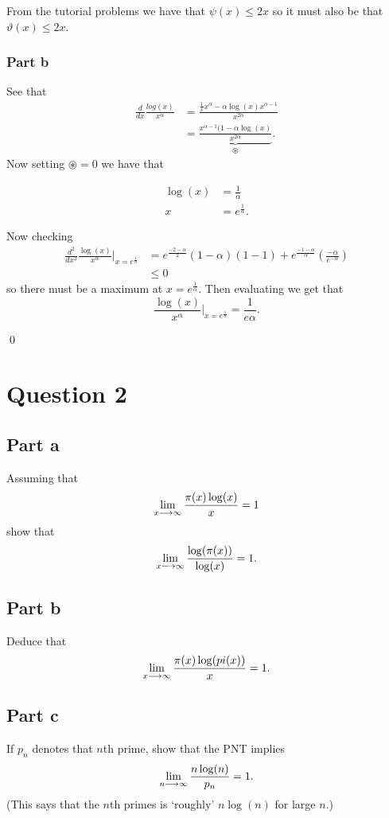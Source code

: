 \documentclass{unswmaths}
\begin{document}
From the tutorial problems we have that $ \psi(x) \leq 2x $ so it must also be that $ \vartheta(x) \leq 2x $.


\subsubsection*{Part b}

See that 
\begin{align*}
	\frac{d}{dx} \frac{log(x)}{x^\alpha} &= \frac{\frac{1}{x} x^\alpha - \alpha \log(x) x^{\alpha-1}}{x^{2\alpha}} \\
		&= \underbrace{\frac{x^{\alpha-1}( 1 - \alpha \log(x)}{x^{2 \alpha}}}_{\circledast}.
\end{align*}
Now setting $ \circledast = 0 $
we have that 

\begin{align*}
	\log(x) &= \frac{1}{\alpha} \\
	x &= e^{\frac{1}{\alpha}}.
\end{align*}


Now checking
\begin{align*}
	\frac{d^2}{dx^2} \frac{\log(x)}{x^\alpha} \Big|_{x = e^{\frac{1}{\alpha}}} &= e^{\frac{-2-\alpha}{2}}(1-\alpha)(1 - 1) + e^\frac{-1-\alpha}{\alpha}\left( \frac{-\alpha}{e^{-\alpha}} \right) \\
	&\leq 0 
\end{align*}
so there must be a maximum at $ x = e^\frac{1}{\alpha} $. Then evaluating we get that
$$
	\frac{\log(x)}{x^\alpha} \Big|_{x = e^\frac{1}{\alpha}} = \frac{1}{e\alpha}.
$$

\qed

\section*{Question 2}

\subsection*{Part a}
Assuming that 
$$
	\lim_{x \longrightarrow \infty} \frac{\pi(x)\log(x)}{x} = 1
$$
show that
$$
	\lim_{x \longrightarrow \infty} \frac{\log(\pi(x))}{\log(x)} = 1.
$$
\subsection*{Part b}
Deduce that 
$$
	\lim_{x \longrightarrow \infty} \frac{\pi(x)\log(pi(x))}{x} = 1.
$$

\subsection*{Part c}
If $ p_n $ denotes that $n$th prime, show that the PNT implies 
$$
	\lim_{n \longrightarrow \infty } \frac{n \log(n)}{p_n} = 1.
$$
(This says that the $n$th primes is `roughly' $ n\log(n) $ for large $n$.)
\end{document}
